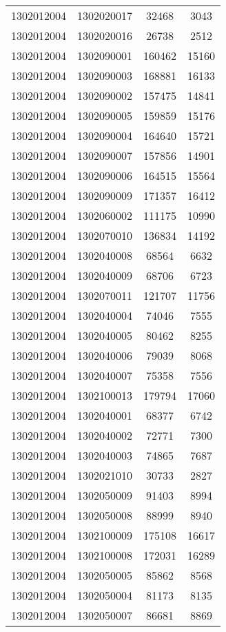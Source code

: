 \begin{longtable}[h]{llcc}
		1302012004 & 1302020017 & 32468 & 3043\\
		1302012004 & 1302020016 & 26738 & 2512\\
		1302012004 & 1302090001 & 160462 & 15160\\
		1302012004 & 1302090003 & 168881 & 16133\\
		1302012004 & 1302090002 & 157475 & 14841\\
		1302012004 & 1302090005 & 159859 & 15176\\
		1302012004 & 1302090004 & 164640 & 15721\\
		1302012004 & 1302090007 & 157856 & 14901\\
		1302012004 & 1302090006 & 164515 & 15564\\
		1302012004 & 1302090009 & 171357 & 16412\\
		1302012004 & 1302060002 & 111175 & 10990\\
		1302012004 & 1302070010 & 136834 & 14192\\
		1302012004 & 1302040008 & 68564 & 6632\\
		1302012004 & 1302040009 & 68706 & 6723\\
		1302012004 & 1302070011 & 121707 & 11756\\
		1302012004 & 1302040004 & 74046 & 7555\\
		1302012004 & 1302040005 & 80462 & 8255\\
		1302012004 & 1302040006 & 79039 & 8068\\
		1302012004 & 1302040007 & 75358 & 7556\\
		1302012004 & 1302100013 & 179794 & 17060\\
		1302012004 & 1302040001 & 68377 & 6742\\
		1302012004 & 1302040002 & 72771 & 7300\\
		1302012004 & 1302040003 & 74865 & 7687\\
		1302012004 & 1302021010 & 30733 & 2827\\
		1302012004 & 1302050009 & 91403 & 8994\\
		1302012004 & 1302050008 & 88999 & 8940\\
		1302012004 & 1302100009 & 175108 & 16617\\
		1302012004 & 1302100008 & 172031 & 16289\\
		1302012004 & 1302050005 & 85862 & 8568\\
		1302012004 & 1302050004 & 81173 & 8135\\
		1302012004 & 1302050007 & 86681 & 8869\\

\end{longtable}
